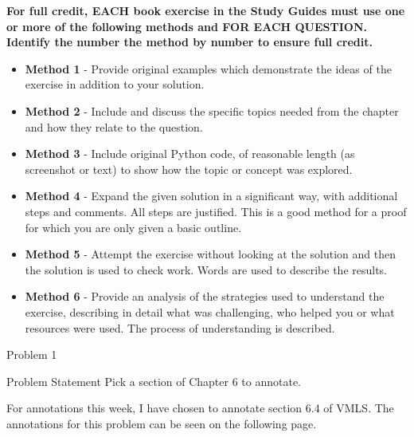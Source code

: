 \textbf{For full credit,  EACH book exercise in the Study Guides must use one or more of the following methods and FOR EACH QUESTION.  Identify the number the method by number to ensure full credit.}

\begin{itemize}
    \item \textbf{Method 1} - Provide original examples which demonstrate the ideas of the exercise in addition to your solution.
    \item \textbf{Method 2} - Include and discuss the specific topics needed from the chapter and how they relate to the question.
    \item \textbf{Method 3} - Include original Python code, of reasonable length (as screenshot or text)  to show how the topic or concept was explored.
    \item \textbf{Method 4} - Expand the given solution in a significant way, with additional steps and comments. All steps are justified. This is a good method for a proof for which you are only given a basic outline.
    \item \textbf{Method 5} - Attempt the exercise without looking at the solution and then the solution is used to check work. Words are used to describe the results.
    \item \textbf{Method 6} - Provide an analysis of the strategies used to understand the exercise, describing in detail what was challenging, who helped you or what resources were used. The process of understanding is
    described.
\end{itemize}

\begin{problem}{Problem 1}
    \begin{statement}{Problem Statement}
        Pick a section of Chapter 6 to annotate.
    \end{statement}

    For annotations this week, I have chosen to annotate section 6.4 of VMLS. The annotations for this problem can be seen on the following page.

    
\end{problem}

